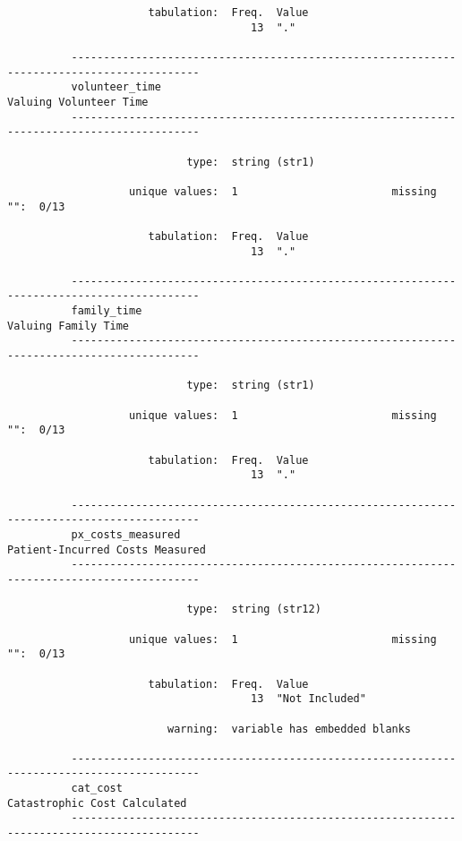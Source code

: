 \documentclass{article}
\begin{document}
\begin{verbatim}
                      tabulation:  Freq.  Value
                                      13  "."
          
          ------------------------------------------------------------------------------------------
          volunteer_time                                                      Valuing Volunteer Time
          ------------------------------------------------------------------------------------------
          
                            type:  string (str1)
          
                   unique values:  1                        missing "":  0/13
          
                      tabulation:  Freq.  Value
                                      13  "."
          
          ------------------------------------------------------------------------------------------
          family_time                                                            Valuing Family Time
          ------------------------------------------------------------------------------------------
          
                            type:  string (str1)
          
                   unique values:  1                        missing "":  0/13
          
                      tabulation:  Freq.  Value
                                      13  "."
          
          ------------------------------------------------------------------------------------------
          px_costs_measured                                          Patient-Incurred Costs Measured
          ------------------------------------------------------------------------------------------
          
                            type:  string (str12)
          
                   unique values:  1                        missing "":  0/13
          
                      tabulation:  Freq.  Value
                                      13  "Not Included"
          
                         warning:  variable has embedded blanks
          
          ------------------------------------------------------------------------------------------
          cat_cost                                                      Catastrophic Cost Calculated
          ------------------------------------------------------------------------------------------
          

\end{verbatim}
\end{document}
